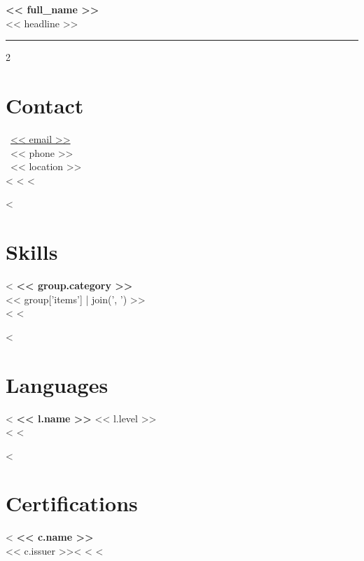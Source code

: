 \documentclass[10pt,a4paper]{article}
\begin{document}
{\Huge\bfseries\color{accent} << full_name >>}\\[2pt]
{\large\color{muted} << headline >>}\\[6pt]
\hrule
\vspace{8pt}

\begin{paracol}{2}


\section*{Contact}
\small
\faEnvelope\ \href{mailto:<< email >>}{<< email >>}\\
\faPhone\ << phone >>\\
\faMapMarker*\ << location >>\\
<%
<%
<%

<%
\section*{Skills}
<%
\textbf{<< group.category >>}\\
\small << group['items'] | join(', ') >>\\[4pt]
<%
<%

<%
\section*{Languages}
<%
\textbf{<< l.name >>} \hfill \small << l.level >>\\
<%
<%

<%
\section*{Certifications}
<%
\textbf{<< c.name >>}\\
\small << c.issuer >><%
<%
<%


\end{paracol}
\end{document}
